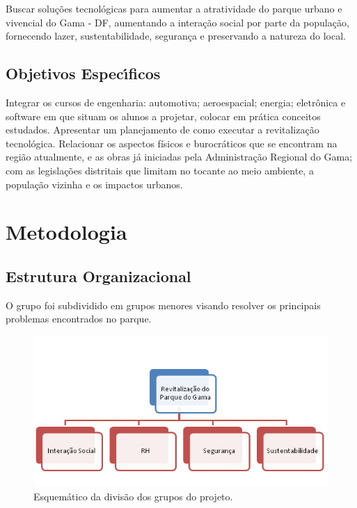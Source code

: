Buscar solu\c{c}\~oes tecnol\'ogicas para aumentar a atratividade do parque urbano e vivencial do Gama - DF, aumentando a intera\c{c}\~ao social por parte da popula\c{c}\~ao, fornecendo lazer, sustentabilidade, seguran\c{c}a e preservando a natureza do local. 

\subsection{Objetivos Espec\'{\i}ficos}

Integrar os cursos de engenharia: automotiva; aeroespacial; energia; eletr\^onica e software em que situam os alunos a projetar, colocar em pr\'atica conceitos estudados. 
Apresentar um planejamento de como executar a revitaliza\c{c}\~ao tecnol\'ogica. Relacionar os aspectos f\'isicos e burocr\'aticos que se encontram na regi\~ao atualmente, e as obras j\'a iniciadas pela Administra\c{c}\~ao Regional do Gama; com as legisla\c{c}\~oes distritais que limitam no tocante ao meio ambiente, a popula\c{c}\~ao vizinha e os impactos urbanos. 

\section{Metodologia}

\subsection{Estrutura Organizacional}

O grupo foi subdividido em grupos menores visando resolver os principais problemas encontrados no parque.

\begin{figure}[H]
	\centering
	\label{Estrutura Organizacional}
		\includegraphics[keepaspectratio=true,scale=1.0]{planejamento/EstruturaOrganizacional.png}
	\caption{Esquem\'atico da divis\~ao dos grupos do projeto.}
\end{figure}

